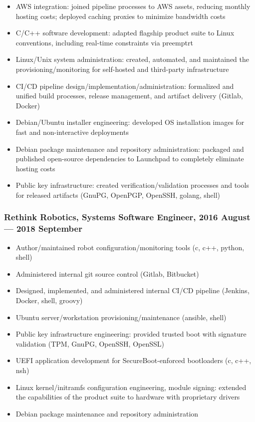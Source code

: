 \documentclass[letterpaper,11pt]{article}
\begin{document}
\begin{itemize}
\item AWS integration: joined pipeline processes to AWS assets, reducing
  monthly hosting costs; deployed caching proxies to minimize bandwidth costs
\item C/C++ software development: adapted flagship product suite to Linux
  conventions, including real-time constraints via preemptrt
\item Linux/Unix system administration: created, automated, and maintained the
  provisioning/monitoring for self-hosted and third-party infrastructure
\item CI/CD pipeline design/implementation/administration: formalized and
  unified build processes, release management, and artifact delivery (Gitlab,
  Docker)
\item Debian/Ubuntu installer engineering: developed OS installation images for
  fast and non-interactive deployments
\item Debian package maintenance and repository administration: packaged and
  published open-source dependencies to Launchpad to completely eliminate
  hosting costs
\item Public key infrastructure: created verification/validation processes and
  tools for released artifacts (GnuPG, OpenPGP, OpenSSH, golang, shell)
\end{itemize}

\subsubsection*{Rethink Robotics, Systems Software Engineer, 2016 August --- 2018 September}

\begin{itemize}
\item Author/maintained robot configuration/monitoring tools (c, c++, python,
  shell)
\item Administered internal git source control (Gitlab, Bitbucket)
\item Designed, implemented, and administered internal CI/CD pipeline (Jenkins,
  Docker, shell, groovy)
\item Ubuntu server/workstation provisioning/maintenance (ansible, shell)
\item Public key infrastructure engineering: provided trusted boot with
  signature validation (TPM, GnuPG, OpenSSH, OpenSSL)
\item UEFI application development for SecureBoot-enforced bootloaders (c, c++,
  nsh)
\item Linux kernel/initramfs configuration engineering, module signing:
  extended the capabilities of the product suite to hardware with proprietary
  drivers
\item Debian package maintenance and repository administration
\end{itemize}
\end{document}

